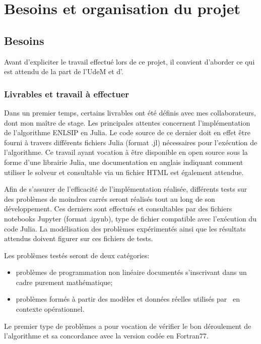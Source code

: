 \chapter{Besoins et organisation du projet}\label{Besoins}

\section{Besoins}

Avant d'expliciter le travail effectué lors de ce projet, il convient d'aborder ce qui est attendu de la part de l'UdeM 
et d'\HQ.

\subsection*{Livrables et travail à effectuer}\label{livrables}

Dans un premier temps, certains livrables ont été définis avec mes collaborateurs, dont mon maître de stage. 
Les principales attentes concernent l'implémentation de l'algorithme ENLSIP en Julia.
Le code source de ce dernier doit en effet être fourni à travers différents fichiers Julia (format .jl) nécessaires
pour l'exécution de l'algorithme. Ce travail ayant vocation à être disponible en open source sous la forme d'une librairie Julia, une documentation en anglais
indiquant comment utiliser le solveur et consultable via un fichier HTML est également attendue. 

Afin de s'assurer de l'efficacité de l'implémentation réalisée, différents tests sur des problèmes de moindres carrés seront réalisés tout au long de son développement.
Ces derniers sont effectués et consultables par des fichiers notebooks Jupyter (format .ipynb), type de fichier compatible avec 
l'exécution du code Julia. La modélisation des problèmes expérimentés ainsi que les résultats attendus doivent figurer sur ces fichiers de tests. 

Les problèmes testés seront de deux catégories:
\begin{itemize}
    \item problèmes de programmation non linéaire documentés s'inscrivant dans un cadre purement mathématique;
    \item problèmes formés à partir des modèles et données réelles utilisés par \HQ\ en contexte opérationnel.
\end{itemize}

Le premier type de problèmes a pour vocation de vérifier le bon déroulement de l'algorithme et sa concordance avec la version
codée en Fortran77.

